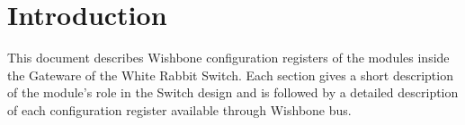 \section{Introduction}

This document describes Wishbone configuration registers of the modules inside
the Gateware of the White Rabbit Switch. Each section gives a short description of
the module's role in the Switch design and is followed by a detailed description
of each configuration register available through Wishbone bus.
